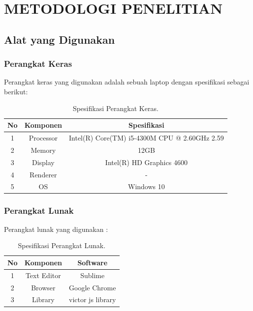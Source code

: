 %
\chapter{METODOLOGI PENELITIAN}\label{cha:metodologi}
\section{Alat yang Digunakan}\label{sec:alat}
\subsection{Perangkat Keras}\label{sec:perangkatk}
\hspace{0.6cm}Perangkat keras yang digunakan adalah sebuah laptop dengan spesifikasi sebagai
berikut:

\begin{table}
\centering
\caption{Spesifikasi Perangkat Keras.}
\begin{center}
\begin{tabular}{|c|c|c|}
\hline
No & Komponen & Spesifikasi \\
\hline
1 & Processor & Intel(R) Core(TM) i5-4300M CPU @ 2.60GHz 2.59 \\
\hline
2 & Memory & 12GB \\
\hline
3 & Display & Intel(R) HD Graphics 4600 \\
\hline
4 & Renderer & - \\
\hline
5 & OS & Windows 10 \\
\hline
\end{tabular}
\end{center}
\end{table}

\subsection{Perangkat Lunak}\label{sec:perangkatl}
\hspace{0.6cm}Perangkat lunak yang digunakan :

\begin{table}
\centering
\caption{Spesifikasi Perangkat Lunak.}
\begin{center}
\begin{tabular}{|c|c|c|}
\hline
No & Komponen & Software \\
\hline
1 & Text Editor & Sublime \\
\hline
2 & Browser & Google Chrome \\
\hline
3 & Library & victor js library \\
\hline
\end{tabular}
\end{center}
\end{table}

